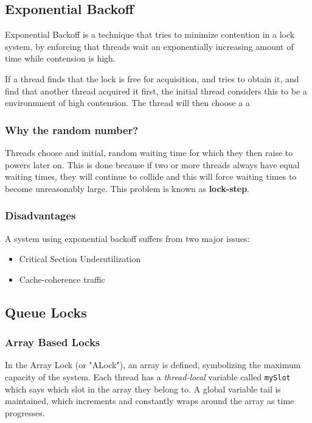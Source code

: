 \documentclass[11pt]{article}
\begin{document}
\subsection{Exponential Backoff}
\label{sec:orgheadline5}

Exponential Backoff is a technique that tries to minimize contention in a lock system, by 
enforcing that threads wait an exponentially increasing amount of time while contension is
high. 

If a thread finds that the lock is free for acquisition, and tries to obtain it, and
find that another thread acquired it first, the initial thread considers this to be a environmnent
of high contension. The thread will then choose a a 

\subsubsection{Why the random number?}
\label{sec:orgheadline3}

Threads choose and initial, random waiting time for which they then raise to powers later on.
This is done because if two or more threads always have equal waiting times, they will 
continue to collide and this will force waiting times to become unreasonably large. This
problem is known as \textbf{lock-step}.

\subsubsection{Disadvantages}
\label{sec:orgheadline4}

A system using exponential backoff suffers from two major issues:

\begin{itemize}
\item Critical Section Underutilization
\item Cache-coherence traffic
\end{itemize}

\subsection{Queue Locks}
\label{sec:orgheadline10}

\subsubsection{Array Based Locks}
\label{sec:orgheadline6}

In the Array Lock (or "ALock"), an array is defined, symbolizing the maximum capacity of the
system. Each thread has a \emph{thread-local} variable called \texttt{mySlot} which says which slot in
the array they belong to. A global variable tail is maintained, which increments and constantly
wraps around the array as time progresses.
\end{document}
